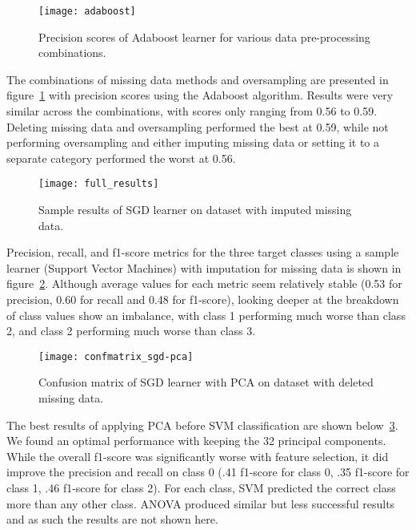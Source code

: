 \documentclass[conference]{IEEEtran}
\begin{document}
\begin{figure}[htpb]
	\centering
	\texttt{[image: adaboost]}
	\caption{Precision scores of Adaboost learner for various data pre-processing combinations.}
	\label{fig:adaboost}
\end{figure}

The combinations of missing data methods and oversampling are presented in figure~\ref{fig:adaboost} with precision scores using the Adaboost algorithm. Results were very similar across the combinations, with scores only ranging from 0.56 to 0.59. Deleting missing data and oversampling performed the best at 0.59, while not performing oversampling and either imputing missing data or setting it to a separate category performed the worst at 0.56.

\begin{figure}[htpb]
	\centering
	\texttt{[image: full\_results]}
	\caption{Sample results of SGD learner on dataset with imputed missing data.}
	\label{fig:full_results}
\end{figure}

Precision, recall, and f1-score metrics for the three target classes using a sample learner (Support Vector Machines) with imputation for missing data is shown in figure~\ref{fig:full_results}. Although average values for each metric seem relatively stable (0.53 for precision, 0.60 for recall and 0.48 for f1-score), looking deeper at the breakdown of class values show an imbalance, with class 1 performing much worse than class 2, and class 2 performing much worse than class 3.

\begin{figure}[htpb]
	\centering
	\texttt{[image: confmatrix\_sgd-pca]}
	\caption{Confusion matrix of SGD learner with PCA on dataset with deleted missing data.}
	\label{fig:sgd_pca_results}
\end{figure}

The best results of applying PCA before SVM classification are shown below~\ref{fig:sgd_pca_results}. We found an optimal performance with keeping the 32 principal components. While the overall f1-score was significantly worse with feature selection, it did improve the precision and recall on class 0 (.41 f1-score for class 0, .35 f1-score for class 1, .46 f1-score for class 2). For each class, SVM predicted the correct class more than any other class. ANOVA produced similar but less successful results and as such the results are not shown here.
\end{document}
